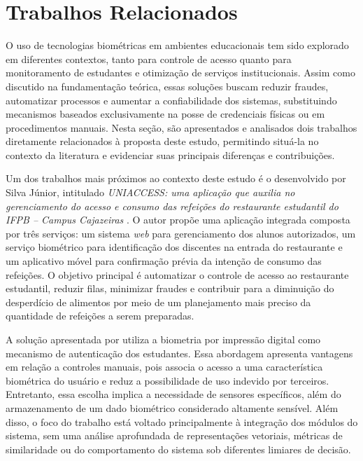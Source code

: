 \chapter{Trabalhos Relacionados}
\label{chap:trabalhos-relacionados}

O uso de tecnologias biométricas em ambientes educacionais tem sido explorado em diferentes contextos, tanto para controle de acesso quanto para monitoramento de estudantes e otimização de serviços institucionais. Assim como discutido na fundamentação teórica, essas soluções buscam reduzir fraudes, automatizar processos e aumentar a confiabilidade dos sistemas, substituindo mecanismos baseados exclusivamente na posse de credenciais físicas ou em procedimentos manuais. Nesta seção, são apresentados e analisados dois trabalhos diretamente relacionados à proposta deste estudo, permitindo situá-la no contexto da literatura e evidenciar suas principais diferenças e contribuições.

Um dos trabalhos mais próximos ao contexto deste estudo é o desenvolvido por Silva Júnior, intitulado \textit{UNIACCESS: uma aplicação que auxilia no gerenciamento do acesso e consumo das refeições do restaurante estudantil do IFPB – Campus Cajazeiras} \cite{silvajunior2025}. O autor propõe uma aplicação integrada composta por três serviços: um sistema \textit{web} para gerenciamento dos alunos autorizados, um serviço biométrico para identificação dos discentes na entrada do restaurante e um aplicativo móvel para confirmação prévia da intenção de consumo das refeições. O objetivo principal é automatizar o controle de acesso ao restaurante estudantil, reduzir filas, minimizar fraudes e contribuir para a diminuição do desperdício de alimentos por meio de um planejamento mais preciso da quantidade de refeições a serem preparadas.

A solução apresentada por \textcite{silvajunior2025} utiliza a biometria por impressão digital como mecanismo de autenticação dos estudantes. Essa abordagem apresenta vantagens em relação a controles manuais, pois associa o acesso a uma característica biométrica do usuário e reduz a possibilidade de uso indevido por terceiros. Entretanto, essa escolha implica a necessidade de sensores específicos, além do armazenamento de um dado biométrico considerado altamente sensível. Além disso, o foco do trabalho está voltado principalmente à integração dos módulos do sistema, sem uma análise aprofundada de representações vetoriais, métricas de similaridade ou do comportamento do sistema sob diferentes limiares de decisão.

